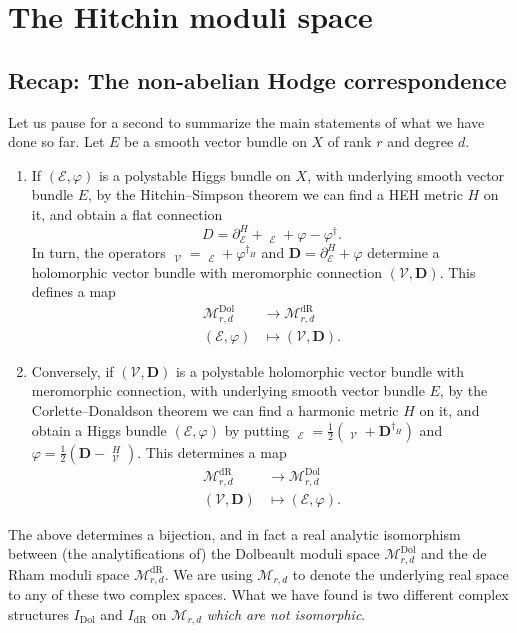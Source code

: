 \documentclass[12pt,a4paper]{amsbook}
\theoremstyle{remark} \newtheorem{rmk}[thm]{Remark}
\theoremstyle{definition} \newtheorem{defn}[thm]{Definition}
\theoremstyle{definition} \newtheorem{ex}[thm]{Example}
\theoremstyle{definition} \newtheorem{ej}{Exercise}
\newcommand{\cM}{\mathcal M}
\newcommand{\sE}{\mathscr E}
\newcommand{\sV}{\mathscr V}
\newcommand{\dR}{\mathrm{dR}}
\newcommand{\Dol}{\mathrm{Dol}}
\DeclareMathOperator{\delbar}{\bar{\partial}}
\begin{document}
\section{The Hitchin moduli space}
\subsection*{Recap: The non-abelian Hodge correspondence}
Let us pause for a second to summarize the main statements of what we have done so far. Let $E$ be a smooth vector bundle on $X$ of rank $r$ and degree $d$.

\begin{enumerate}
\item If $(\sE,\varphi)$ is a polystable Higgs bundle on $X$, with underlying smooth vector bundle $E$, by the Hitchin--Simpson theorem we can find a HEH metric $H$ on it, and obtain a flat connection
\begin{equation*}
D= \partial_{\sE}^H +\delbar_{\sE}+ \varphi - \varphi^\dagger.
\end{equation*}
In turn, the operators $\delbar_{\sV}=\delbar_{\sE} + \varphi^{\dagger_H}$ and $\bm{D}=\partial_{\sE}^H + \varphi$ determine a holomorphic vector bundle with meromorphic connection $(\sV,\bm{D})$. This defines a map
        \begin{align*}
          \cM_{r,d}^{\Dol} & \longrightarrow  \cM_{r,d}^{\dR} \\
           (\sE,\varphi) & \longmapsto (\sV,\bm{D}).
        \end{align*}

  \item Conversely, if $(\sV,\bm{D})$ is a polystable holomorphic vector bundle with meromorphic connection, with underlying smooth vector bundle $E$, by the Corlette--Donaldson theorem we can find a harmonic metric $H$ on it, and obtain a Higgs bundle $(\sE,\varphi)$ by putting $\delbar_{\sE}= \tfrac{1}{2}(\delbar_{\sV}+ \bm{D}^{\dagger_H})$ and $\varphi=\tfrac{1}{2}(\bm{D}-\delbar_{\sV}^H)$. This determines a map
        \begin{align*}
          \cM_{r,d}^{\dR} & \longrightarrow  \cM_{r,d}^{\Dol} \\
           (\sV,\bm{D}) & \longmapsto (\sE,\varphi).
        \end{align*}
\end{enumerate}
The above determines a bijection, and in fact a real analytic isomorphism between (the analytifications of) the Dolbeault moduli space $\cM^{\Dol}_{r,d}$ and the de Rham moduli space $\cM^{\dR}_{r,d}$. We are using $\cM_{r,d}$ to denote the underlying real space to any of these two complex spaces. What we have found is two different complex structures $I_{\Dol}$ and $I_{\dR}$ on $\cM_{r,d}$ \textit{which are not isomorphic}.
\end{document}
